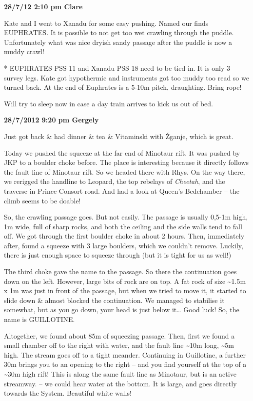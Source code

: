 \textbf{28/7/12 2:10 pm Clare}

Kate and I went to Xanadu for some easy pushing. Named our finds
EUPHRATES. It is possible to not get too wet crawling through the
puddle. Unfortunately what was nice dryish sandy passage after the
puddle is now a muddy crawl!

* EUPHRATES PSS 11 and Xanadu PSS 18 need to be tied in. It is only 3
survey legs. Kate got hypothermic and instruments got too muddy too read
so we turned back. At the end of Euphrates is a 5-10m pitch, draughting.
Bring rope!

Will try to sleep now in case a day train arrives to kick us out of bed.

\textbf{28/7/2012 9:20 pm Gergely}

Just got back \& had dinner \& tea \& Vitaminski with Žganje, which is
great.

Today we pushed the squeeze at the far end of Minotaur rift. It was
pushed by JKP to a boulder choke before. The place is interesting
because it directly follows the fault line of Minotaur rift. So we
headed there with Rhys. On the way there, we rerigged the handline to
Leopard, the top rebelays of \emph{Cheetah}, and the traverse in Prince
Consort road. And had a look at Queen's Bedchamber -- the climb seems to
be doable!

So, the crawling passage goes. But not easily. The passage is usually
0,5-1m high, 1m wide, full of sharp rocks, and both the ceiling and the
side walls tend to fall off. We got through the first boulder choke in
about 2 hours. Then, immediately after, found a squeeze with 3 large
boulders, which we couldn't remove. Luckily, there is just enough space
to squeeze through (but it is tight for us as well!)

The third choke gave the name to the passage. So there the continuation
goes down on the left. However, large bits of rock are on top. A fat
rock of size \textasciitilde{}1.5m x 1m was just in front of the
passage, but when we tried to move it, it started to slide down \&
almost blocked the continuation. We managed to stabilise it somewhat,
but as you go down, your head is just below it\ldots{} Good luck! So,
the name is GUILLOTINE.

Altogether, we found about 85m of squeezing passage. Then, first we
found a small chamber off to the right with water, and the fault line
\textasciitilde{}10m long, \textasciitilde{}5m high. The stream goes off
to a tight meander. Continuing in Guillotine, a further 30m brings you
to an opening to the right -- and you find yourself at the top of a
\textasciitilde{}30m high rift! This is along the same fault line as
Minotaur, but is an active streamway. -- we could hear water at the
bottom. It is large, and goes directly towards the System. Beautiful
white walls!

